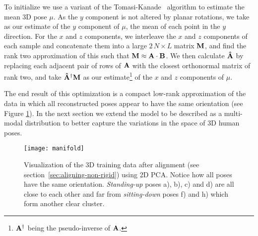 \documentclass[10pt,twocolumn,letterpaper]{article}
\begin{document}
To initialize we use a variant of the Tomasi-Kanade~\cite{Tomasi1992}
algorithm to estimate the mean 3D pose ${\mu}$. As the $y$
component is not altered by planar rotations, we take as our estimate
of the $y$ component of ${\mu}$, the mean of each point in the
$y$ direction. For the $x$ and $z$ components, we interleave the $x$
and $z$ components of each sample and concatenate them into a large
$2\,N \times L$ matrix ${\bf M}$, and find the
rank two approximation of this such that ${\bf M} \approx {\bf A}\cdot {\bf B}$. We
then calculate $ {\bf \hat A}$ by replacing each adjacent pair of rows
of ${\bf A}$ with the closest orthonormal matrix of rank two, and take
${\bf \hat A^{\dag} M}$ as our estimate\footnote{${\bf A}^\dag$ being the
  pseudo-inverse of ${\bf A}$.}  of the $x$ and $z$
components of $\mu$.

The end result of this optimization is a compact low-rank
approximation of the data in which all reconstructed poses appear to
have the same orientation (see Figure \ref{fig:manifold}). In the next
section we extend the  model to be described as a multi-modal
distribution to better capture the variations in the space of 3D human
poses.
\begin{figure}[tb]
  \begin{center}
    \vspace{-7mm}
  \texttt{[image: manifold]}
\end{center}
    \vspace{-7mm}
   \caption{\small Visualization of the 3D training data after alignment (see
     section~\ref{sec:aligning-non-rigid}) using 2D PCA. Notice how
     all poses have the same orientation.  \emph{Standing-up} poses
     a), b), c) and d) are all close to each other and far from
     \emph{sitting-down} poses f) and h) which form another clear
     cluster.
     \label{fig:manifold}\vspace{-7mm}}
\end{figure}
\end{document}
